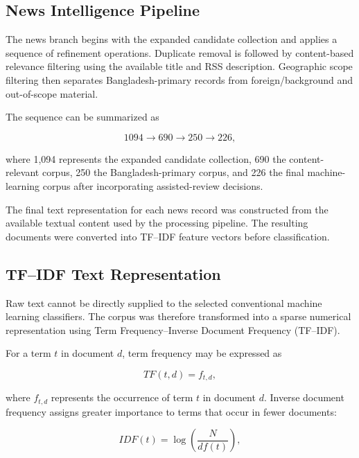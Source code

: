 \documentclass[conference]{IEEEtran}
\begin{document}
\subsection{News Intelligence Pipeline}

The news branch begins with the expanded candidate collection and applies a
sequence of refinement operations. Duplicate removal is followed by
content-based relevance filtering using the available title and RSS
description. Geographic scope filtering then separates Bangladesh-primary
records from foreign/background and out-of-scope material.

The sequence can be summarized as

\begin{equation}
1094 \rightarrow 690 \rightarrow 250 \rightarrow 226,
\end{equation}

where 1,094 represents the expanded candidate collection, 690 the
content-relevant corpus, 250 the Bangladesh-primary corpus, and 226 the final
machine-learning corpus after incorporating assisted-review decisions.

The final text representation for each news record was constructed from the
available textual content used by the processing pipeline. The resulting
documents were converted into TF--IDF feature vectors before classification.

\subsection{TF--IDF Text Representation}

Raw text cannot be directly supplied to the selected conventional machine
learning classifiers. The corpus was therefore transformed into a sparse
numerical representation using Term Frequency--Inverse Document Frequency
(TF--IDF).

For a term $t$ in document $d$, term frequency may be expressed as

\begin{equation}
TF(t,d) = f_{t,d},
\end{equation}

where $f_{t,d}$ represents the occurrence of term $t$ in document $d$.
Inverse document frequency assigns greater importance to terms that occur
in fewer documents:

\begin{equation}
IDF(t) =
\log\left(
\frac{N}{df(t)}
\right),
\end{equation}
\end{document}
